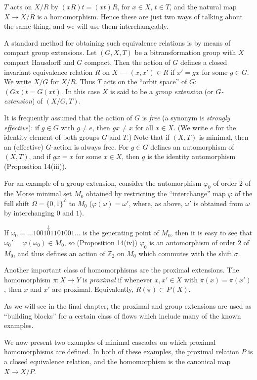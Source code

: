 $T$ acts on $X/R$ by $(xR)t = (xt)R$, for $x \in X$, $t \in T$, and the natural map $X \to X/R$ is a homomorphism. Hence these are just two ways of talking about the same thing, and we will use them interchangeably.

A standard method for obtaining such equivalence relations is by means of compact group extensions. Let $(G, X, T)$ be a bitransformation group with $X$ compact Hausdorff and $G$ compact. Then the action of $G$ defines a closed invariant equivalence relation $R$ on $X$ — $(x, x') \in R$ if $x' = g x$ for some $g \in G$. We write $X / G$ for $X / R$. Thus $T$ acts on the “orbit space” of $G$: $(Gx)t = G(xt)$. In this case $X$ is said to be a \textit{group extension} (or \textit{$G$-extension}) of $(X / G, T)$.

It is frequently assumed that the action of $G$ is \textit{free} (a synonym is \textit{strongly effective}): if $g \in G$ with $g \ne e$, then $gx \ne x$ for all $x \in X$. (We write $e$ for the identity element of both groups $G$ and $T$.) Note that if $(X, T)$ is minimal, then an (effective) $G$-action is always free. For $g \in G$ defines an automorphism of $(X, T)$, and if $gx = x$ for some $x \in X$, then $g$ is the identity automorphism (Proposition 14(iii)).

For an example of a group extension, consider the automorphism $\varphi_0$ of order $2$ of the Morse minimal set $M_0$ obtained by restricting the “interchange” map $\varphi$ of the full shift $\Omega = \{0,1\}^{\mathbb{Z}}$ to $M_0$ ($\varphi(\omega) = \omega'$, where, as above, $\omega'$ is obtained from $\omega$ by interchanging $0$ and $1$).

If $\omega_0 = \ldots 1001\overset{\downarrow}{0}1101001\ldots$ is the generating point of $M_0$, then it is easy to see that $\omega_0' = \varphi(\omega_0) \in M_0$, so (Proposition 14(iv)) $\varphi_0$ is an automorphism of order $2$ of $M_0$, and thus defines an action of $\mathbb{Z}_2$ on $M_0$ which commutes with the shift $\sigma$.

Another important class of homomorphisms are the proximal extensions. The homomorphism $\pi : X \to Y$ is \textit{proximal} if whenever $x, x' \in X$ with $\pi(x) = \pi(x')$, then $x$ and $x'$ are proximal. Equivalently, $R(\pi) \subset P(X)$.

As we will see in the final chapter, the proximal and group extensions are used as “building blocks” for a certain class of flows which include many of the known examples.

We now present two examples of minimal cascades on which proximal homomorphisms are defined. In both of these examples, the proximal relation $P$ is a closed equivalence relation, and the homomorphism is the canonical map $X \to X / P$.

